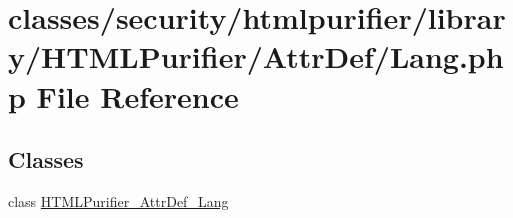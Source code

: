 \hypertarget{AttrDef_2Lang_8php}{\section{classes/security/htmlpurifier/library/\+H\+T\+M\+L\+Purifier/\+Attr\+Def/\+Lang.php File Reference}
\label{AttrDef_2Lang_8php}
}
\subsection*{Classes}
\begin{DoxyCompactItemize}
\item 
class \hyperlink{classHTMLPurifier__AttrDef__Lang}{H\+T\+M\+L\+Purifier\+\_\+\+Attr\+Def\+\_\+\+Lang}
\end{DoxyCompactItemize}
